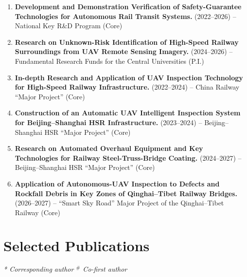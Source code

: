 \documentclass[11pt,a4paper]{article}
\begin{document}
\begin{enumerate}[leftmargin=1.6em,itemsep=2.5pt]
  \item \textbf{Development and Demonstration Verification of Safety-Guarantee Technologies for Autonomous Rail Transit Systems.} (2022--2026) -- National Key R\&D Program (Core)
  \item \textbf{Research on Unknown-Risk Identification of High-Speed Railway Surroundings from UAV Remote Sensing Imagery.} (2024--2026) -- Fundamental Research Funds for the Central Universities (P.I.)
  \item \textbf{In-depth Research and Application of UAV Inspection Technology for High-Speed Railway Infrastructure.} (2022--2024) -- China Railway ``Major Project'' (Core)
  \item \textbf{Construction of an Automatic UAV Intelligent Inspection System for Beijing--Shanghai HSR Infrastructure.} (2023--2024) -- Beijing--Shanghai HSR ``Major Project'' (Core)
  \item \textbf{Research on Automated Overhaul Equipment and Key Technologies for Railway Steel-Truss-Bridge Coating.} (2024--2027) -- Beijing--Shanghai HSR ``Major Project'' (Core)
  \item \textbf{Application of Autonomous-UAV Inspection to Defects and Rockfall Debris in Key Zones of Qinghai--Tibet Railway Bridges.} (2026--2027) -- ``Smart Sky Road'' Major Project of the Qinghai--Tibet Railway (Core)
\end{enumerate}

\section{Selected Publications}

\noindent\textit{* Corresponding author \quad $^\#$ Co-first author}
\end{document}
